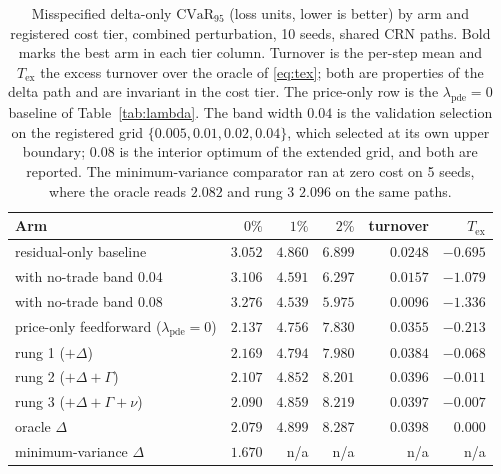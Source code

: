 \documentclass{article}
\begin{document}
\begin{table}[h]
\caption{Misspecified delta-only $\mathrm{CVaR}_{95}$ (loss units, lower is better)
by arm and registered cost tier, combined perturbation, 10 seeds, shared CRN paths.
Bold marks the best arm in each tier column. Turnover is the per-step mean and
$T_{\mathrm{ex}}$ the excess turnover over the oracle of \eqref{eq:tex}; both are
properties of the delta path and are invariant in the cost tier. The price-only row
is the $\lambda_{\mathrm{pde}} = 0$ baseline of Table~\ref{tab:lambda}. The band
width $0.04$ is the validation selection on the registered grid
$\{0.005, 0.01, 0.02, 0.04\}$, which selected at its own upper boundary; $0.08$ is
the interior optimum of the extended grid, and both are reported. The
minimum-variance comparator ran at zero cost on 5 seeds, where the oracle reads
$2.082$ and rung 3 $2.096$ on the same paths.}
\label{tab:tiers}
\centering\footnotesize\setlength{\tabcolsep}{5pt}
\begin{tabular}{@{}lrrrrr@{}}
\toprule
Arm & $0\%$ & $1\%$ & $2\%$ & turnover & $T_{\mathrm{ex}}$ \\
\midrule
residual-only baseline & $3.052$ & $4.860$ & $6.899$ & $0.0248$ & $-0.695$ \\
\quad with no-trade band $0.04$ & $3.106$ & $4.591$ & $6.297$ & $0.0157$ & $-1.079$ \\
\quad with no-trade band $0.08$ & $3.276$ & $\mathbf{4.539}$ & $\mathbf{5.975}$ & $0.0096$ & $-1.336$ \\
price-only feedforward ($\lambda_{\mathrm{pde}}{=}0$) & $2.137$ & $4.756$ & $7.830$ & $0.0355$ & $-0.213$ \\
rung 1 ($+\Delta$) & $2.169$ & $4.794$ & $7.980$ & $0.0384$ & $-0.068$ \\
rung 2 ($+\Delta{+}\Gamma$) & $2.107$ & $4.852$ & $8.201$ & $0.0396$ & $-0.011$ \\
rung 3 ($+\Delta{+}\Gamma{+}\nu$) & $2.090$ & $4.859$ & $8.219$ & $0.0397$ & $-0.007$ \\
oracle $\Delta$ & $2.079$ & $4.899$ & $8.287$ & $0.0398$ & $0.000$ \\
minimum-variance $\Delta$ & $\mathbf{1.670}$ & n/a & n/a & n/a & n/a \\
\bottomrule
\end{tabular}
\end{table}
\end{document}
